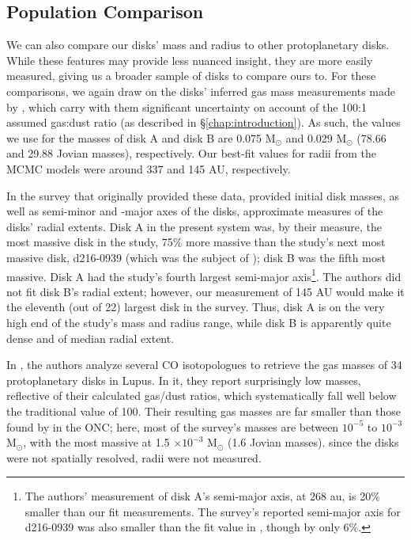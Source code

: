 \subsection{Population Comparison}

We can also compare our disks' mass and radius to other protoplanetary disks. While these features may provide less nuanced insight, they are more easily measured, giving us a broader sample of disks to compare ours to. For these comparisons, we again draw on the disks' inferred gas mass measurements made by \citet{Williams2014}, which carry with them significant uncertainty on account of the 100:1 assumed gas:dust ratio (as described in \S\ref{chap:introduction}). As such, the values we use for the masses of disk A and disk B are 0.075 M$_\odot$ and 0.029 M$_\odot$ (78.66 and 29.88 Jovian masses), respectively. Our best-fit values for radii from the MCMC models were around 337 and 145 AU, respectively.

In the survey that originally provided these data, \citet{Mann2014} provided initial disk masses, as well as semi-minor and -major axes of the disks, approximate measures of the disks' radial extents. Disk A in the present system was, by their measure, the most massive disk in the study, 75\% more massive than the study's next most massive disk, d216-0939 (which was the subject of \citet{Factor2017}); disk B was the fifth most massive. Disk A had the study's fourth largest semi-major axis\footnote{The authors' measurement of disk A's semi-major axis, at 268 au, is 20\% smaller than our fit measurements. The survey's reported semi-major axis for d216-0939 was also smaller than the fit value in \citet{Factor2017}, though by only 6\%.}. The authors did not fit disk B's radial extent; however, our measurement of 145 AU would make it the eleventh (out of 22) largest disk in the survey. Thus, disk A is on the very high end of the study's mass and radius range, while disk B is apparently quite dense and of median radial extent.


In \citet{Miotello2016}, the authors analyze several CO isotopologues to retrieve the gas masses of 34 protoplanetary disks in Lupus. In it, they report surprisingly low masses, reflective of their calculated gas/dust ratios, which systematically fall well below the traditional value of 100. Their resulting gas masses are far smaller than those found by \cite{Mann2014} in the ONC; here, most of the survey's masses are between $10^{-5}$ to $10^{-3}$ M$_\odot$, with the most massive at 1.5 $\times 10^{-3}$ M$_\odot$ (1.6 Jovian masses). since the disks were not spatially resolved, radii were not measured.



